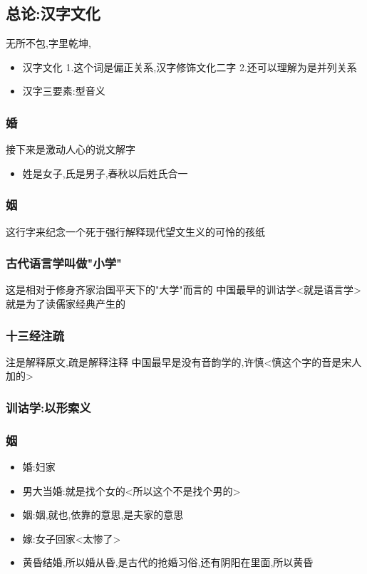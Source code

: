 \documentclass[11pt]{article}
\begin{document}
\subsection{总论:汉字文化}
\label{sec:org37e1039}
无所不包,字里乾坤,
\begin{itemize}
\item 汉字文化
1.这个词是偏正关系,汉字修饰文化二字
2.还可以理解为是并列关系
\item 汉字三要素:型音义
\end{itemize}
\subsubsection{婚}
\label{sec:orgc8fea58}
接下来是激动人心的说文解字
\begin{itemize}
\item 姓是女子,氏是男子,春秋以后姓氏合一
\end{itemize}
\subsubsection{姻}
\label{sec:org5f23d62}
这行字来纪念一个死于强行解释现代望文生义的可怜的孩纸
\subsubsection{古代语言学叫做"小学"}
\label{sec:orga703ac9}
这是相对于修身齐家治国平天下的"大学"而言的
中国最早的训诂学<就是语言学>就是为了读儒家经典产生的
\subsubsection{十三经注疏}
\label{sec:orgd0d0f3c}
注是解释原文,疏是解释注释
中国最早是没有音韵学的,许慎<慎这个字的音是宋人加的>
\subsubsection{训诂学:以形索义}
\label{sec:orgdc22764}
\subsubsection{姻}
\label{sec:orgcce1d12}
\begin{itemize}
\item 婚:妇家
\item 男大当婚:就是找个女的<所以这个不是找个男的>
\item 姻:姻,就也,依靠的意思,是夫家的意思
\item 嫁:女子回家<太惨了>
\item 黄昏结婚,所以婚从昏,是古代的抢婚习俗,还有阴阳在里面,所以黄昏
\end{itemize}
\end{document}
